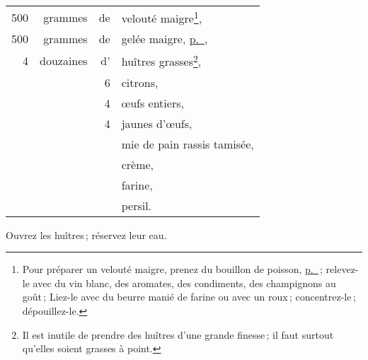 \footnotesize
\begin{longtable}{rrrp{16em}}
  500 & grammes   & de & velouté maigre\footnote{\label{pg0292} \hypertarget{p0292}{}Pour préparer 
                                      un velouté maigre, prenez du bouillon de poisson, 
                                      \hyperlink{p0218}{p. \pageref{pg0218}} ; relevez-le avec du vin 
                                      blanc, des aromates, des condiments, des champignons 
                                      au goût ; Liez-le avec du beurre manié de farine ou 
                                      avec un roux ; concentrez-le ; dépouillez-le.},                     \\
  500 & grammes   & de & gelée maigre, \hyperlink{p0350}{p. \pageref{pg0350}},                            \\
    4 & douzaines & d’ & huîtres grasses\footnote{Il est inutile de prendre des
                                      huîtres d'une grande finesse ; il faut surtout
                                      qu'elles soient grasses à point.},                                  \\
      &           &  6 & citrons,                                                                         \\
      &           &  4 & œufs entiers,                                                                    \\
      &           &  4 & jaunes d'œufs,                                                                   \\
      &           &    & mie de pain rassis tamisée,                                                      \\
      &           &    & crème,                                                                           \\
      &           &    & farine,                                                                          \\
      &           &    & persil.                                                                          \\
\end{longtable}
\normalsize

Ouvrez les huîtres ; réservez leur eau.

